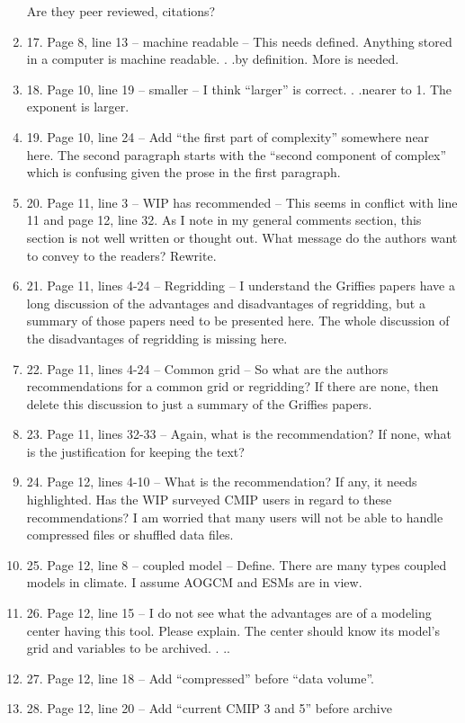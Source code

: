 \documentclass[gmd,manuscript]{copernicus}
\begin{document}
\begin{enumerate}[label=RC1-\arabic*,leftmargin=*]
  Are they peer reviewed, citations?
\item 17. Page 8, line 13 – machine readable – This needs defined.
  Anything stored in a computer is machine readable. . .by definition.
  More is needed.
\item 18. Page 10, line 19 – smaller – I think “larger” is correct. .
  .nearer to 1. The exponent is larger.
\item 19. Page 10, line 24 – Add “the first part of complexity”
  somewhere near here. The second paragraph starts with the “second
  component of complex” which is confusing given the prose in the
  first paragraph.
\item 20. Page 11, line 3 – WIP has recommended – This seems in
  conflict with line 11 and page 12, line 32. As I note in my general
  comments section, this section is not well written or thought out.
  What message do the authors want to convey to the readers? Rewrite.
\item 21. Page 11, lines 4-24 – Regridding – I understand the Griffies
  papers have a long discussion of the advantages and disadvantages of
  regridding, but a summary of those papers need to be presented here.
  The whole discussion of the disadvantages of regridding is missing
  here.
\item 22. Page 11, lines 4-24 – Common grid – So what are the authors
  recommendations for a common grid or regridding? If there are none,
  then delete this discussion to just a summary of the Griffies
  papers.
\item 23. Page 11, lines 32-33 – Again, what is the recommendation? If
  none, what is the justification for keeping the text?
\item 24. Page 12, lines 4-10 – What is the recommendation? If any, it
  needs highlighted. Has the WIP surveyed CMIP users in regard to
  these recommendations? I am worried that many users will not be able
  to handle compressed files or shuffled data files.
\item 25. Page 12, line 8 – coupled model – Define. There are many
  types coupled models in climate. I assume AOGCM and ESMs are in
  view.
\item 26. Page 12, line 15 – I do not see what the advantages are of a
  modeling center having this tool. Please explain. The center should
  know its model’s grid and variables to be archived. . ..
\item 27. Page 12, line 18 – Add “compressed” before “data volume”.
\item 28. Page 12, line 20 – Add “current CMIP 3 and 5” before archive

\end{enumerate}
\end{document}
